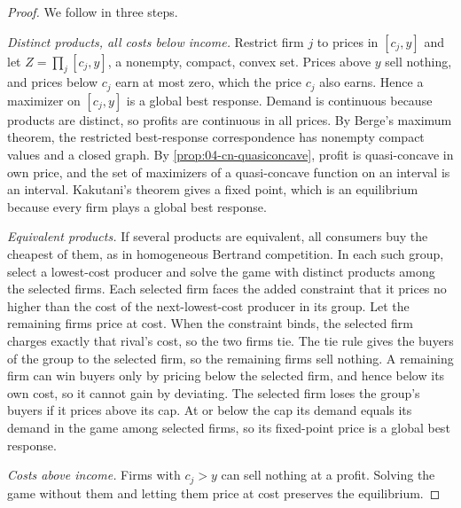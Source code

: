 \begin{proof}
We follow \citet[pp.~14--15]{CaplinNalebuff1991} in three steps.

\emph{Distinct products, all costs below income.} Restrict firm $j$ to prices in $[c_j, y]$ and let
$Z = \prod_j[c_j, y]$, a nonempty, compact, convex set. Prices above $y$ sell nothing, and prices below $c_j$
earn at most zero, which the price $c_j$ also earns. Hence a maximizer on $[c_j, y]$ is a global best response.
Demand is continuous because products are distinct, so profits are continuous in all prices. By Berge's maximum
theorem, the restricted best-response correspondence has nonempty compact values and a closed graph. By
\cref{prop:04-cn-quasiconcave}, profit is quasi-concave in own price, and the set of maximizers of a
quasi-concave function on an interval is an interval. Kakutani's theorem gives a fixed point, which is an
equilibrium because every firm plays a global best response.

\emph{Equivalent products.} If several products are equivalent, all consumers buy the cheapest of them, as in
homogeneous Bertrand competition. In each such group, select a lowest-cost producer and solve the game with
distinct products among the selected firms. Each selected firm faces the added constraint that it prices no higher
than the cost of the next-lowest-cost producer in its group. Let the remaining firms price at cost. When the
constraint binds, the selected firm charges exactly that rival's cost, so the two firms tie.
The tie rule gives the buyers of the group to the selected firm, so the remaining firms sell nothing. A remaining
firm can win buyers only by pricing below the selected firm, and hence below its own cost, so it cannot gain by
deviating. The selected firm loses the group's buyers if it prices above its cap. At or below the cap its demand
equals its demand in the game among selected firms, so its fixed-point price is a global best response.

\emph{Costs above income.} Firms with $c_j > y$ can sell nothing at a profit. Solving the game without them and
letting them price at cost preserves the equilibrium.
\end{proof}

